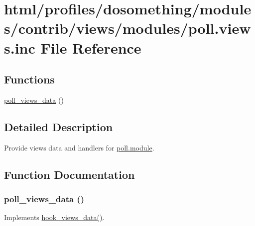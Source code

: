 \hypertarget{poll_8views_8inc}{
\section{html/profiles/dosomething/modules/contrib/views/modules/poll.views.inc File Reference}
\label{poll_8views_8inc}
}
\subsection*{Functions}
\begin{DoxyCompactItemize}
\item 
\hyperlink{poll_8views_8inc_a02ad941a7e05ae1fe142ac35ad3ccb19}{poll\_\-views\_\-data} ()
\end{DoxyCompactItemize}


\subsection{Detailed Description}
Provide views data and handlers for \hyperlink{poll_8module}{poll.module}. 

\subsection{Function Documentation}
\hypertarget{poll_8views_8inc_a02ad941a7e05ae1fe142ac35ad3ccb19}{
\subsubsection[{poll\_\-views\_\-data}]{\setlength{\rightskip}{0pt plus 5cm}poll\_\-views\_\-data ()}}
\label{poll_8views_8inc_a02ad941a7e05ae1fe142ac35ad3ccb19}
Implements \hyperlink{group__views__hooks_ga227057901681e4a33e33c199c7a8c989}{hook\_\-views\_\-data()}. 